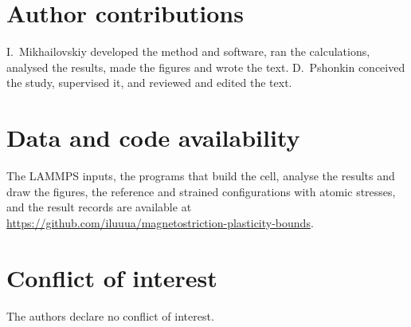 \documentclass[11pt,a4paper]{article}
\begin{document}
\section*{Author contributions}

I.~Mikhailovskiy developed the method and software, ran the calculations,
analysed the results, made the figures and wrote the text. D.~Pshonkin
conceived the study, supervised it, and reviewed and edited the text.

\section*{Data and code availability}

The LAMMPS inputs, the programs that build the cell, analyse the results and
draw the figures, the reference and strained configurations with atomic
stresses, and the result records are available at
\url{https://github.com/iluuua/magnetostriction-plasticity-bounds}.

\section*{Conflict of interest}

The authors declare no conflict of interest.



\end{document}
